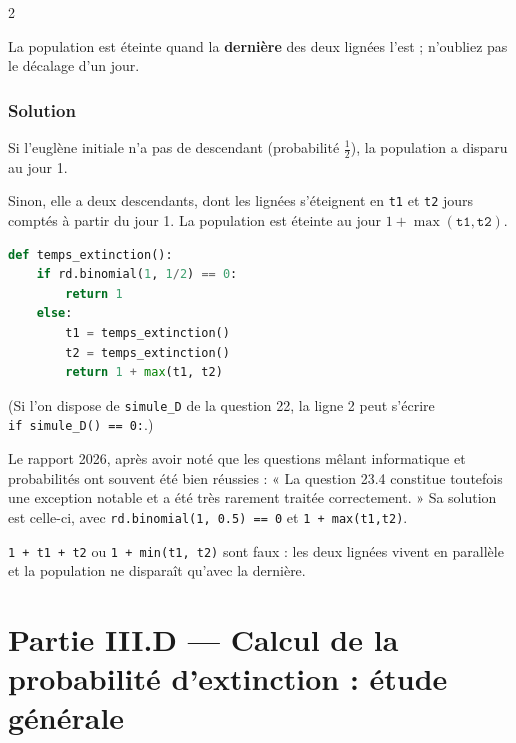 \documentclass[11pt,a4paper]{article}
\begin{document}
\begin{indication}{2}

La population est éteinte quand la \textbf{dernière} des deux lignées l'est ; n'oubliez pas le décalage d'un jour.

\end{indication}

\hypertarget{solution-50}{%
\subsubsection{Solution}\label{solution-50}}

Si l'euglène initiale n'a pas de descendant (probabilité \(\frac12\)), la population a disparu au jour 1.

Sinon, elle a deux descendants, dont les lignées s'éteignent en \texttt{t1} et \texttt{t2} jours comptés à partir du jour 1. La population est éteinte au jour \(1+\max(\texttt{t1},\texttt{t2})\).

\begin{lstlisting}[language=Python]
def temps_extinction():
    if rd.binomial(1, 1/2) == 0:
        return 1
    else:
        t1 = temps_extinction()
        t2 = temps_extinction()
        return 1 + max(t1, t2)
\end{lstlisting}

(Si l'on dispose de \texttt{simule\_D} de la question 22, la ligne 2 peut s'écrire \texttt{if\ simule\_D(\allowbreak{})\allowbreak{}\ =\allowbreak{}=\allowbreak{}\ 0:\allowbreak{}}.)

\begin{jury}

Le rapport 2026, après avoir noté que les questions mêlant informatique et probabilités ont souvent été bien réussies : « La question 23.4 constitue toutefois une exception notable et a été très rarement traitée correctement. » Sa solution est celle-ci, avec \texttt{rd.binomial(\allowbreak{}1,\allowbreak{}\ 0.5)\allowbreak{}\ =\allowbreak{}=\allowbreak{}\ 0} et \texttt{1\ +\ max(t1,t2)}.

\end{jury}

\begin{piege}

\texttt{1\ +\ t1\ +\ t2} ou \texttt{1\ +\ min(t1,\ t2)} sont faux : les deux lignées vivent en parallèle et la population ne disparaît qu'avec la dernière.

\end{piege}

\hypertarget{partie-iii.d-calcul-de-la-probabilituxe9-dextinction-uxe9tude-guxe9nuxe9rale}{%
\section{Partie III.D --- Calcul de la probabilité d'extinction : étude générale}\label{partie-iii.d-calcul-de-la-probabilituxe9-dextinction-uxe9tude-guxe9nuxe9rale}}
\end{document}
